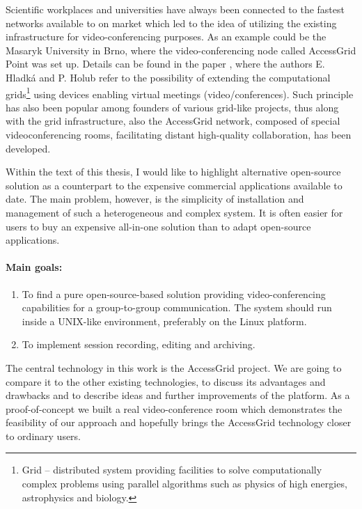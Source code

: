 Scientific workplaces and universities have always been connected to the fastest networks available to on market which led to the idea of utilizing the existing infrastructure for video-conferencing purposes. As an example could be the Masaryk University in Brno, where the video-conferencing node called AccessGrid Point was set up. Details can be found in the paper \cite{ArticleUVTMU-KomunikaceAGPoint}, where the authors E. Hladká and P. Holub refer to the possibility of extending the computational grids\footnote{Grid -- distributed system providing facilities to solve computationally complex problems using parallel algorithms such as physics of high energies, astrophysics and biology.} using devices enabling virtual meetings (video/conferences). Such principle has also been popular among founders of various grid-like projects, thus along with the grid infrastructure, also the AccessGrid network, composed of special videoconferencing rooms, facilitating distant high-quality collaboration, has been developed.

Within the text of this thesis, I would like to highlight alternative open-source solution as a counterpart to the expensive commercial applications available to date.
The main problem, however, is the simplicity of installation and management of such a heterogeneous and complex system. It is often easier for users to buy an expensive all-in-one solution than to adapt open-source applications.

\paragraph*{Main goals:}

\begin{enumerate}
\item To find a pure open-source-based solution providing video-conferencing capabilities for a group-to-group communication.
The system should run inside a UNIX-like environment, preferably on the Linux platform.

\item To implement session recording, editing and archiving.
\end{enumerate}

The central technology in this work is the AccessGrid project.
We are going to compare it to the other existing technologies, to discuss its advantages and drawbacks and to describe ideas and further improvements of the platform. As a proof-of-concept we built a real video-conference room which demonstrates the feasibility of our approach and hopefully brings the AccessGrid technology closer to ordinary users.